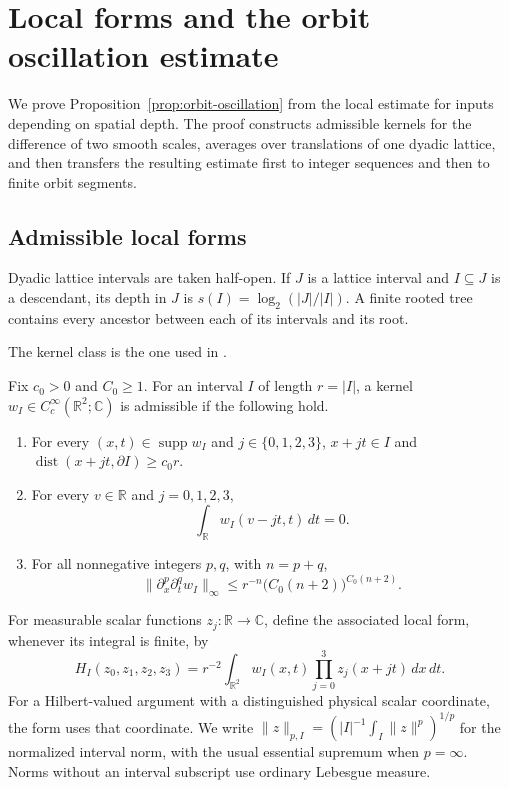 \section{Local forms and the orbit oscillation estimate}
\label{sec:transfer}

We prove Proposition~\ref{prop:orbit-oscillation} from the local estimate
for inputs depending on spatial depth.  The proof constructs admissible
kernels for the difference of two smooth scales, averages over translations
of one dyadic lattice, and then transfers the resulting estimate first to
integer sequences and then to finite orbit segments.

\subsection{Admissible local forms}

Dyadic lattice intervals are taken half-open.  If \(J\) is a lattice
interval and \(I\subseteq J\) is a descendant, its depth in \(J\) is
\(s(I)=\log_2(|J|/|I|)\).  A finite rooted tree contains every ancestor
between each of its intervals and its root.

The kernel class is the one used in \cite[Section~2]{H}.
\begin{definition}
\label{def:transfer-local-kernels}
Fix \(c_0>0\) and \(C_0\geq1\).  For an interval \(I\) of length
\(r=|I|\), a kernel \(w_I\in C_c^\infty(\mathbb R^2;\mathbb C)\) is
admissible if the following hold.
\begin{enumerate}
\item For every \((x,t)\in\operatorname{supp}w_I\) and
 \(j\in\{0,1,2,3\}\),
 \(x+jt\in I\) and
 \(\operatorname{dist}(x+jt,\partial I)\geq c_0r\).
\item For every \(v\in\mathbb R\) and \(j=0,1,2,3\),
 \[
  \int_{\mathbb R}w_I(v-jt,t)\,dt=0.
 \]
\item For all nonnegative integers \(p,q\), with \(n=p+q\),
 \[
  \|\partial_x^p\partial_t^q w_I\|_\infty
     \leq r^{-n}\bigl(C_0(n+2)\bigr)^{C_0(n+2)}.
 \]
\end{enumerate}
For measurable scalar functions \(z_j:\mathbb R\to\mathbb C\), define
the associated local form, whenever its integral is finite, by
\[
H_I(z_0,z_1,z_2,z_3)
   =r^{-2}\int_{\mathbb R^2}w_I(x,t)
                  \prod_{j=0}^3z_j(x+jt)\,dx\,dt.
\]
For a Hilbert-valued argument with a distinguished physical scalar
coordinate, the form uses that coordinate.  We write
\(\|z\|_{p,I}=(|I|^{-1}\int_I\|z\|^p)^{1/p}\) for the normalized interval
norm, with the usual essential supremum when \(p=\infty\).  Norms without
an interval subscript use ordinary Lebesgue measure.
\end{definition}

